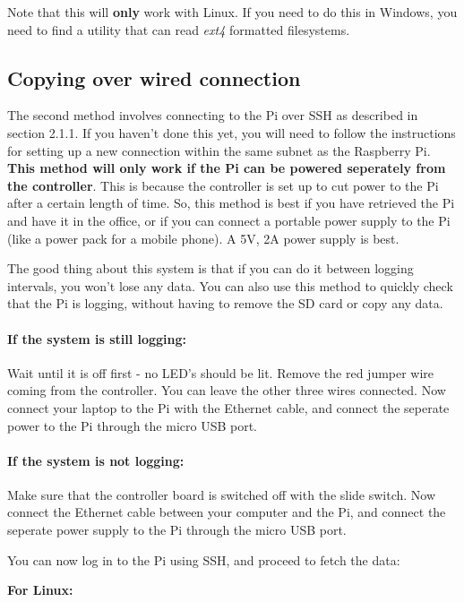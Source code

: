 \documentclass[10pt]{article}
\begin{document}
Note that this will \textbf{only} work with Linux. If you need to do this in Windows, you need to find a utility that can read \textit{ext4} formatted filesystems.

\subsection{Copying over wired connection}

The second method involves connecting to the Pi over SSH as described in section 2.1.1. If you haven't done this yet, you will need to follow the instructions for setting up a new connection within the same subnet as the Raspberry Pi. \textbf{This method will only work if the Pi can be powered seperately from the controller}. This is because the controller is set up to cut power to the Pi after a certain length of time. So, this method is best if you have retrieved the Pi and have it in the office, or if you can connect a portable power supply to the Pi (like a power pack for a mobile phone). A 5V, 2A power supply is best.

The good thing about this system is that if you can do it between logging intervals, you won't lose any data. You can also use this method to quickly check that the Pi is logging, without having to remove the SD card or copy any data.

\paragraph{If the system is still logging:}
Wait until it is off first - no LED's should be lit. Remove the red jumper wire coming from the controller. You can leave the other three wires connected. Now connect your laptop to the Pi with the Ethernet cable, and connect the seperate power to the Pi through the micro USB port.

\paragraph{If the system is not logging:}
Make sure that the controller board is switched off with the slide switch. Now connect the Ethernet cable between your computer and the Pi, and connect the seperate power supply to the Pi through the micro USB port. \newline

You can now log in to the Pi using SSH, and proceed to fetch the data:

\textbf{For Linux:} \newline
\end{document}

